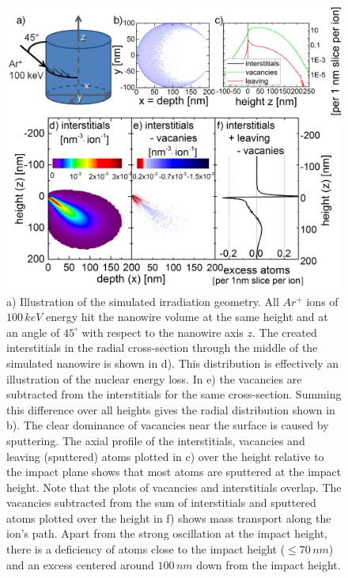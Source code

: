 \begin{figure}[h]
	\centering
		\includegraphics[width=.9\textwidth]{images/deformationBCA.jpg}
		\caption{a) Illustration of the simulated irradiation geometry. All $Ar^+$ ions of $100\,keV$ energy hit the nanowire volume at the same height and at an angle of $45^\circ$ with respect to the nanowire axis $z$. The created interstitials in the radial cross-section through the middle of the simulated nanowire is shown in d). This distribution is effectively an illustration of the nuclear energy loss. In e) the vacancies are subtracted from the interstitials for the same cross-section. Summing this difference over all heights gives the radial distribution shown in b). The clear dominance of vacancies near the surface is caused by sputtering. The axial profile of the interstitials, vacancies and leaving (sputtered) atoms plotted in c) over the height relative to the impact plane shows that most atoms are sputtered at the impact height. Note that the plots of vacancies and interstitials overlap. The vacancies subtracted from the sum of interstitials and sputtered atoms plotted over the height in f) shows mass transport along the ion's path. Apart from the strong oscillation at the impact height, there is a deficiency of atoms close to the impact height ($\le 70\,nm$) and an excess centered around $100\,nm$ down from the impact height.} 
	\label{deformationBCA}	
\end{figure}


